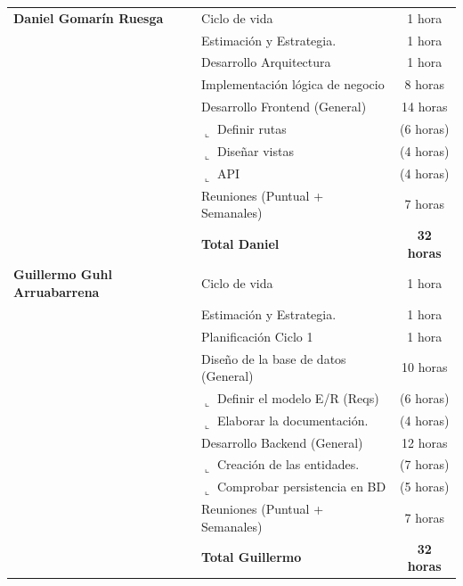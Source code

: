 \documentclass[12pt,a4paper,titlepage]{article}
\begin{document}
\begin{longtable}{@{}llc@{}}
    \textbf{Daniel Gomarín Ruesga} 
     & Ciclo de vida & 1 hora \\
     & Estimación y Estrategia. & 1 hora \\
     & Desarrollo Arquitectura & 1 hora \\
     & Implementación lógica de negocio & 8 horas \\
     & Desarrollo Frontend (General) & 14 horas \\
     & $\llcorner$ Definir rutas & (6 horas) \\
     & $\llcorner$ Diseñar vistas & (4 horas) \\
     & $\llcorner$ API & (4 horas) \\
     & Reuniones (Puntual + Semanales) & 7 horas \\ 
     & \textbf{Total Daniel} & \textbf{32 horas} \\ \midrule

    \textbf{Guillermo Guhl Arruabarrena} 
     & Ciclo de vida & 1 hora \\
     & Estimación y Estrategia. & 1 hora \\
     & Planificación Ciclo 1 & 1 hora \\
     & Diseño de la base de datos (General) & 10 horas \\
     & $\llcorner$ Definir el modelo E/R (Reqs) & (6 horas) \\
     & $\llcorner$ Elaborar la documentación. & (4 horas) \\
     & Desarrollo Backend (General) & 12 horas \\
     & $\llcorner$ Creación de las entidades. & (7 horas) \\
     & $\llcorner$ Comprobar persistencia en BD & (5 horas) \\
     & Reuniones (Puntual + Semanales) & 7 horas \\ 
     & \textbf{Total Guillermo} & \textbf{32 horas} \\ \midrule


\end{longtable}
\end{document}

